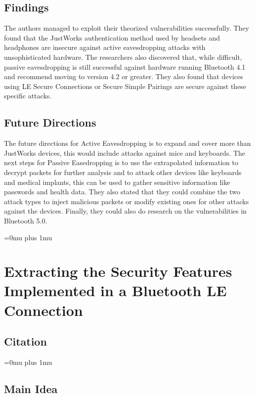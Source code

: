 \documentclass[letterpaper,12pt]{article}
\begin{document}
\subsection{Findings}

\noindent
The authors managed to exploit their theorized vulnerabilities successfully.  They found that the JustWorks authentication method used by headsets and headphones are insecure against active eavesdropping attacks with unsophisticated hardware.  The researchers also discovered that, while difficult, passive eavesdropping is still successful against hardware running Bluetooth 4.1 and recommend moving to version 4.2 or greater.  They also found that devices using LE Secure Connections or Secure Simple Pairings are secure against these specific attacks.

\subsection{Future Directions}

\noindent
The future directions for Active Eavesdropping is to expand and cover more than JustWorks devices, this would include attacks against mice and keyboards.  The next steps for Passive Easedropping is to use the extrapolated information to decrypt packets for further analysis and to attack other devices like keyboards and medical implants, this can be used to gather sensitive information like passwords and health data.  They also stated that they could combine the two attack types to inject malicious packets or modify existing ones for other attacks against the devices.  Finally, they could also do research on the vulnerabilities in Bluetooth 5.0.

\Urlmuskip=0mu plus 1mu\relax


\pagebreak

\section{Extracting the Security Features Implemented in a Bluetooth LE Connection}


\noindent
\subsection{Citation}
\Urlmuskip=0mu plus 1mu\relax
{}

\subsection{Main Idea}
\end{document}
